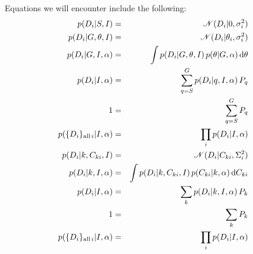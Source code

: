\documentclass[12pt, letterpaper]{article}
\newcommand{\data}{D}
\newcommand{\alldata}{\{D_i\}_{{\mathrm{all}}\,i}}
\newcommand{\galpars}{\theta}
\newcommand{\hyperpars}{\alpha}
\newcommand{\amplitude}{C}
\begin{document}
Equations we will encounter include the following:
\begin{eqnarray}\displaystyle
p(\data_i|S,I) &=& \normal(\data_i|0,\sigma_i^2) \\
p(\data_i|G,\galpars,I) &=& \normal(\data_i|\galpars_i,\sigma_i^2) \\
p(\data_i|G,I,\hyperpars) &=& \int p(\data_i|G,\galpars,I)\,p(\galpars|G,\hyperpars)\,\dd \galpars \\
p(\data_i|I,\hyperpars) &=& \sum_{q=S}^G p(\data_i|q,I,\hyperpars)\,P_q \\
1 &=& \sum_{q=S}^G P_q \\
p(\alldata|I,\hyperpars) &=& \prod_i p(\data_i|I,\hyperpars) \\
p(\data_i|k,\amplitude_{ki},I) &=& \normal(\data_i|\amplitude_{ki},\Sigma_i^2) \\
p(\data_i|k,I,\hyperpars) &=& \int p(\data_i|k,\amplitude_{ki},I)\,p(\amplitude_{ki}|k,\hyperpars)\,\dd \amplitude_{ki} \\
p(\data_i|I,\hyperpars) &=& \sum_k p(\data_i|k,I,\hyperpars)\,P_k \\
1 &=& \sum_k P_k \\
p(\alldata|I,\hyperpars) &=& \prod_i p(\data_i|I,\hyperpars) \\
\end{eqnarray}
\end{document}
